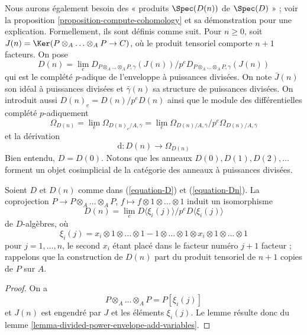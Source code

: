 \medskip\noindent
Nous aurons également besoin des « produits $\Spec(D(n))$ de $\Spec(D)$ » ; voir la
proposition \ref{proposition-compute-cohomology} et sa démonstration pour une
explication. Formellement, ils sont définis comme suit. Pour $n \geq 0$, soit
$J(n) = \Ker(P \otimes_A \ldots \otimes_A P \to C)$, où
le produit tensoriel comporte $n + 1$ facteurs. On pose
\begin{equation}
\label{equation-Dn}
D(n) = \lim_e
D_{P \otimes_A \ldots \otimes_A P, \gamma}(J(n))/
p^eD_{P \otimes_A \ldots \otimes_A P, \gamma}(J(n))
\end{equation}
qui est le complété $p$-adique de l'enveloppe à puissances divisées.
On note $\bar J(n)$ son idéal à puissances divisées et $\bar \gamma(n)$
sa structure de puissances divisées. On introduit aussi $D(n)_e = D(n)/p^eD(n)$ ainsi
que le module des différentielles complété $p$-adiquement
\begin{equation}
\label{equation-omega-Dn}
\Omega_{D(n)} = \lim_e \Omega_{D(n)_e/A, \bar\gamma} =
\lim_e \Omega_{D(n)/A, \bar\gamma}/p^e\Omega_{D(n)/A, \bar\gamma}
\end{equation}
et la dérivation
\begin{equation}
\label{equation-derivation-Dn}
\text{d} : D(n) \longrightarrow \Omega_{D(n)}
\end{equation}
Bien entendu, $D = D(0)$. Notons que les anneaux $D(0), D(1), D(2), \ldots$
forment un objet cosimplicial de la catégorie des anneaux à puissances divisées.

\begin{lemma}
\label{lemma-structure-Dn}
Soient $D$ et $D(n)$ comme dans (\ref{equation-D}) et (\ref{equation-Dn}).
La coprojection $P \to P \otimes_A \ldots \otimes_A P$,
$f \mapsto f \otimes 1 \otimes \ldots \otimes 1$
induit un isomorphisme
\begin{equation}
\label{equation-structure-Dn}
D(n) = \lim_e D\langle \xi_i(j) \rangle/p^eD\langle \xi_i(j) \rangle
\end{equation}
de $D$-algèbres, où
$$
\xi_i(j) = x_i \otimes 1 \otimes \ldots \otimes 1 -
1 \otimes \ldots \otimes 1 \otimes x_i \otimes 1 \otimes \ldots \otimes 1
$$
pour $j = 1, \ldots, n$, le second $x_i$ étant placé dans le facteur numéro $j + 1$
facteur ; rappelons que la construction de $D(n)$ part du
produit tensoriel de $n + 1$ copies de $P$ sur $A$.
\end{lemma}

\begin{proof}
On a
$$
P \otimes_A \ldots \otimes_A P = P[\xi_i(j)]
$$
et $J(n)$ est engendré par $J$ et les éléments $\xi_i(j)$.
Le lemme résulte donc du
lemme \ref{lemma-divided-power-envelope-add-variables}.
\end{proof}

